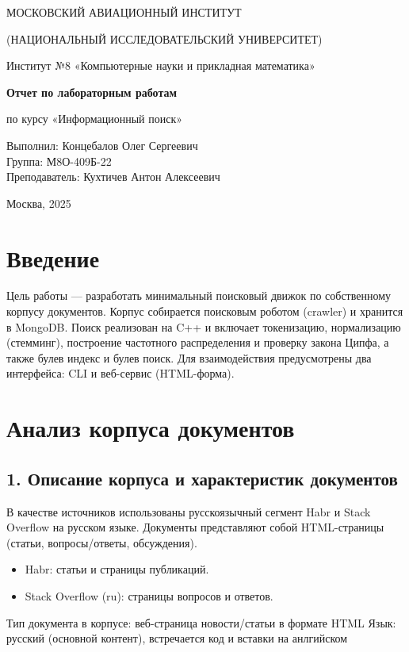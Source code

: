 \documentclass[12pt,a4paper]{article}
\begin{document}
\begin{titlepage}
\centering
{\large МОСКОВСКИЙ АВИАЦИОННЫЙ ИНСТИТУТ \par}
{\large (НАЦИОНАЛЬНЫЙ ИССЛЕДОВАТЕЛЬСКИЙ УНИВЕРСИТЕТ) \par}
\vspace{1.6cm}
{\large Институт №8 «Компьютерные науки и прикладная математика» \par}

\vfill

{\LARGE \textbf{Отчет по лабораторным работам} \par}
\vspace{0.4cm}
{\Large по курсу «Информационный поиск» \par}

\vfill

\begin{flushright}
Выполнил: Концебалов Олег Сергеевич\\
Группа: М8О-409Б-22\\
Преподаватель: Кухтичев Антон Алексеевич
\end{flushright}

\vfill

{Москва, 2025}
\end{titlepage}

\section*{Введение}

Цель работы — разработать минимальный поисковый движок по собственному корпусу документов. Корпус собирается поисковым роботом (crawler) и хранится в MongoDB. Поиск реализован на C++ и включает токенизацию, нормализацию (стемминг), построение частотного распределения и проверку закона Ципфа, а также булев индекс и булев поиск. Для взаимодействия предусмотрены два интерфейса: CLI и веб-сервис (HTML-форма).


\section*{Анализ корпуса документов}

\subsection*{1.  Описание корпуса и характеристик документов}

В качестве источников использованы русскоязычный сегмент Habr и Stack Overflow на русском языке. Документы представляют собой HTML-страницы (статьи, вопросы/ответы, обсуждения). 
\begin{itemize}
\item Habr: статьи и страницы публикаций. 
\item Stack Overflow (ru): страницы вопросов и ответов.
\end{itemize}
\newline 
Тип документа в корпусе: веб-страница новости/статьи в формате HTML
\newline
Язык: русский (основной контент), встречается код и вставки на анлгийском
\end{document}
